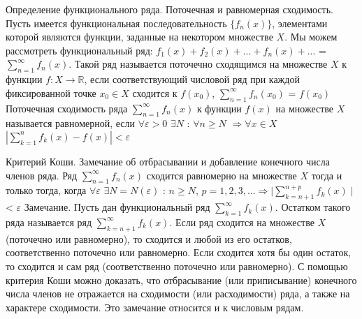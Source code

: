 \documentclass[12pt, a4paper]{article}
\newenvironment{field}{}{\newpage}
\newif\ifnote
\newenvironment{note}{\notetrue}{\notefalse}
\begin{document}
\begin{note}
\begin{field}
Определение функционального ряда. Поточечная и равномерная сходимость.
\end{field}
\begin{field}
Пусть имеется функциональная последовательность $\{f_n(x)\}$, элементами которой являются функции, заданные на некотором множестве $X$. Мы можем рассмотреть функциональный ряд: $f_1(x) + f_2(x) + ... + f_n(x) + ...$ = $\sum\limits_{n=1}^{\infty}f_n(x)$.
\newline
Такой ряд называется поточечно сходящимся на множестве $X$ к функции $f : X \to \mathbb{R}$, если соответствующий числовой ряд при каждой фиксированной точке $x_0 \in X$ сходится к $f(x_0)$, $\sum\limits_{n=1}^{\infty}f_n(x_0)$ = $f(x_0)$
\newline
Поточечная сходимость ряда $\sum\limits_{n=1}^{\infty}f_n(x)$ к функции $f(x)$ на множестве $X$ называется равномерной, если $\forall \varepsilon > 0$ $\exists N$ : $\forall n \geq N$ $ \Longrightarrow \forall x \in X$ $|\sum\limits_{k=1}^{n}f_k(x) - f(x)| < \varepsilon$

\end{field}
\end{note}

\begin{note}
\begin{field}
Критерий Коши. Замечание об отбрасывании и добавление конечного числа членов ряда.
\end{field}
\begin{field}
Ряд $\sum\limits_{n=1}^{\infty}f_n(x)$ сходится равномерно на множестве $X$ тогда и только тогда, когда $\forall \varepsilon$ $\exists N = N(\varepsilon)$ : $n \geq N$, $p = 1, 2, 3, ... \Longrightarrow \mid\sum\limits_{k=n+1}^{n+p}f_k(x) \mid$ < $\varepsilon$
\newline
Замечание. Пусть дан функциональный ряд $\sum\limits_{k=1}^{\infty}f_k(x)$. Остатком такого ряда называется ряд $\sum\limits_{k=n+1}^{\infty}f_k(x)$. Если ряд сходится на множестве $X$ (поточечно или равномерно), то сходится и любой из его остатков, соответственно поточечно или равномерно. Если сходится хотя бы один остаток, то сходится и сам ряд (соответственно поточечно или равномерно).
\newline
С помощью критерия Коши можно доказать, что отбрасывание (или приписывание) конечного числа членов не отражается на сходимости (или расходимости) ряда, а также на характере сходимости. Это замечание относится и к числовым рядам.

\end{field}
\end{note}
\end{document}
